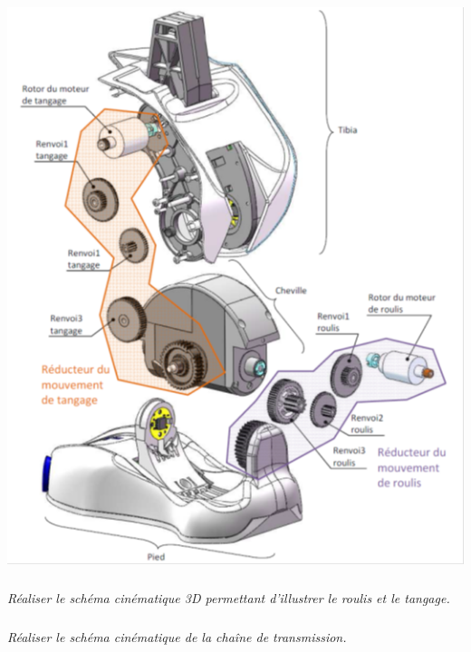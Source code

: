 \documentclass[10pt,fleqn]{article} %
\begin{document}
\begin{multicols}{2}
\begin{center}
\includegraphics[width=\linewidth]{images/nao_01}
\end{center}



\subparagraph{}
\textit{Réaliser le schéma cinématique 3D permettant d'illustrer le roulis et le tangage.}


\subparagraph{}
\textit{Réaliser le schéma cinématique de la chaîne de transmission.}


\end{multicols}
\end{document}
